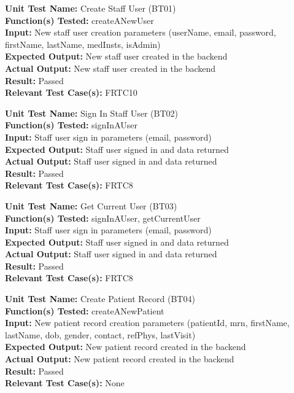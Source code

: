 \documentclass[12pt, titlepage]{article}
\begin{document}
\begin{mdframed}[linewidth=0.5mm]
  \textbf{Unit Test Name:} Create Staff User (BT01) \\
  \textbf{Function(s) Tested:} createANewUser \\
  \textbf{Input:} New staff user creation parameters (userName, email, password, firstName, lastName, medInsts, isAdmin) \\
  \textbf{Expected Output:} New staff user created in the backend \\
  \textbf{Actual Output:} New staff user created in the backend \\
  \textbf{Result:} Passed \\
  \textbf{Relevant Test Case(s):} FRTC10
\end{mdframed}

\begin{mdframed}[linewidth=0.5mm]
  \textbf{Unit Test Name:} Sign In Staff User (BT02) \\
  \textbf{Function(s) Tested:} signInAUser \\
  \textbf{Input:} Staff user sign in parameters (email, password) \\
  \textbf{Expected Output:} Staff user signed in and data returned \\
  \textbf{Actual Output:} Staff user signed in and data returned \\
  \textbf{Result:} Passed \\
  \textbf{Relevant Test Case(s):} FRTC8
\end{mdframed}

\begin{mdframed}[linewidth=0.5mm]
  \textbf{Unit Test Name:} Get Current User (BT03) \\
  \textbf{Function(s) Tested:} signInAUser, getCurrentUser \\
  \textbf{Input:} Staff user sign in parameters (email, password) \\
  \textbf{Expected Output:} Staff user signed in and data returned \\
  \textbf{Actual Output:} Staff user signed in and data returned \\
  \textbf{Result:} Passed \\
  \textbf{Relevant Test Case(s):} FRTC8
\end{mdframed}

\begin{mdframed}[linewidth=0.5mm]
  \textbf{Unit Test Name:} Create Patient Record (BT04) \\
  \textbf{Function(s) Tested:} createANewPatient \\
  \textbf{Input:} New patient record creation parameters (patientId, mrn, firstName, lastName, dob, gender, contact, refPhys, lastVisit) \\
  \textbf{Expected Output:} New patient record created in the backend \\
  \textbf{Actual Output:} New patient record created in the backend \\
  \textbf{Result:} Passed \\
  \textbf{Relevant Test Case(s):} None
\end{mdframed}
\end{document}
